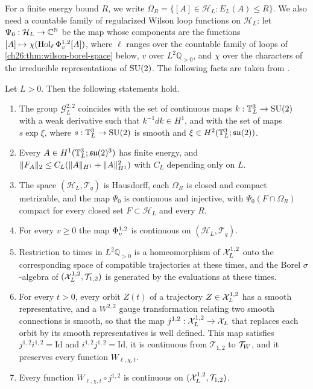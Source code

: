 For a finite energy bound $R$, we write $\Omega_R=\{[A]\in\mathcal H_L:E_L(A)\le R\}$. We also need a countable family of regularized Wilson loop functions on $\mathcal H_L$: let $\Psi_0:\mathcal H_L\to\mathbb C^{\mathbb N}$ be the map whose components are the functions $[A]\mapsto\chi(\operatorname{Hol}_\ell\Phi^{1,2}_v[A])$, where $\ell$ ranges over the countable family of loops of \cref{ch26:thm:wilson-borel-space} below, $v$ over $L^2\mathbb Q_{>0}$, and $\chi$ over the characters of the irreducible representations of $\mathrm{SU}(2)$. The following facts are taken from \cite{CCState2023v4}.

\begin{lemma}\label{ch26:lem:sobolev-quotient-facts}
Let $L>0$. Then the following statements hold.
\begin{enumerate}
\item The group $\mathcal G_L^{2,2}$ coincides with the set of continuous maps $k:\mathbb T_L^3\to\mathrm{SU}(2)$ with a weak derivative such that $k^{-1}dk\in H^1$, and with the set of maps $s\exp\xi$, where $s:\mathbb T_L^3\to\mathrm{SU}(2)$ is smooth and $\xi\in H^2(\mathbb T_L^3;\mathfrak{su}(2))$.
\item Every $A\in H^1(\mathbb T_L^3;\mathfrak{su}(2)^3)$ has finite energy, and $\lVert F_A\rVert_2\le C_L(\lVert A\rVert_{H^1}+\lVert A\rVert_{H^1}^2)$ with $C_L$ depending only on $L$.
\item The space $(\mathcal H_L,\mathcal T_q)$ is Hausdorff, each $\Omega_R$ is closed and compact metrizable, and the map $\Psi_0$ is continuous and injective, with $\Psi_0(F\cap\Omega_R)$ compact for every closed set $F\subset\mathcal H_L$ and every $R$.
\item For every $v\ge0$ the map $\Phi^{1,2}_v$ is continuous on $(\mathcal H_L,\mathcal T_q)$.
\item Restriction to times in $L^2\mathbb Q_{>0}$ is a homeomorphism of $\mathcal X_L^{1,2}$ onto the corresponding space of compatible trajectories at these times, and the Borel $\sigma$-algebra of $(\mathcal X_L^{1,2},\mathcal T_{1,2})$ is generated by the evaluations at these times.
\item For every $t>0$, every orbit $Z(t)$ of a trajectory $Z\in\mathcal X_L^{1,2}$ has a smooth representative, and a $W^{2,2}$ gauge transformation relating two smooth connections is smooth, so that the map $j^{1,2}:\mathcal X_L^{1,2}\to\mathcal X_L$ that replaces each orbit by its smooth representatives is well defined. This map satisfies $j^{1,2}i^{1,2}=\mathrm{Id}$ and $i^{1,2}j^{1,2}=\mathrm{Id}$, it is continuous from $\mathcal T_{1,2}$ to $\mathcal T_W$, and it preserves every function $W_{\ell,\chi,t}$.
\item Every function $W_{\ell,\chi,t}\circ j^{1,2}$ is continuous on $(\mathcal X_L^{1,2},\mathcal T_{1,2})$.
\end{enumerate}
\end{lemma}

